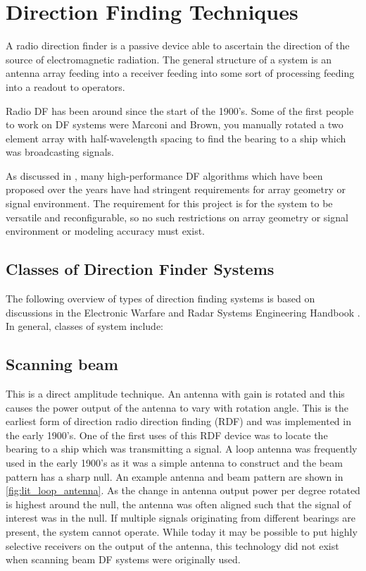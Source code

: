 \section{Direction Finding Techniques}
A radio direction finder is a passive device able to ascertain the direction of the source of electromagnetic radiation. 
The general structure of a system is an antenna array feeding into a receiver feeding into some sort of processing feeding into a readout to operators.

Radio DF has been around since the start of the 1900's. Some of the first people to work on DF  systems were Marconi and Brown, you manually rotated a two element array with half-wavelength spacing to find the bearing to a ship which was broadcasting signals. 

As discussed in \cite{farrier1990direction}, many high-performance DF algorithms which have been proposed over the years have had stringent requirements for array geometry or signal environment. The requirement for this project is for the system to be versatile and reconfigurable, so no such restrictions on array geometry or signal environment or modeling accuracy must exist. 

\subsection{Classes of Direction Finder Systems}
The following overview of types of direction finding systems is based on discussions in the Electronic Warfare and Radar Systems Engineering Handbook \cite{desk1997electronic}.
In general, classes of system include:

\subsection{Scanning beam}
This is a direct amplitude technique. An antenna with gain is rotated and this causes the power output of the antenna to vary with rotation angle. This is the earliest form of direction radio direction finding (RDF)  and was implemented in the early 1900's. One of the first uses of this RDF device was to locate the bearing to a ship which was transmitting a signal. A loop antenna was frequently used in the early 1900's as it was a simple antenna to construct and the beam pattern has a sharp null. An example antenna and beam pattern are shown in \autoref{fig:lit_loop_antenna}. As the change in antenna output power per degree rotated is highest around the null, the antenna was often aligned such that the signal of interest was in the null. If multiple signals originating from different bearings are present, the system cannot operate. While today it may be possible to put highly selective receivers on the output of the antenna, this technology did not exist when scanning beam DF systems were originally used.

